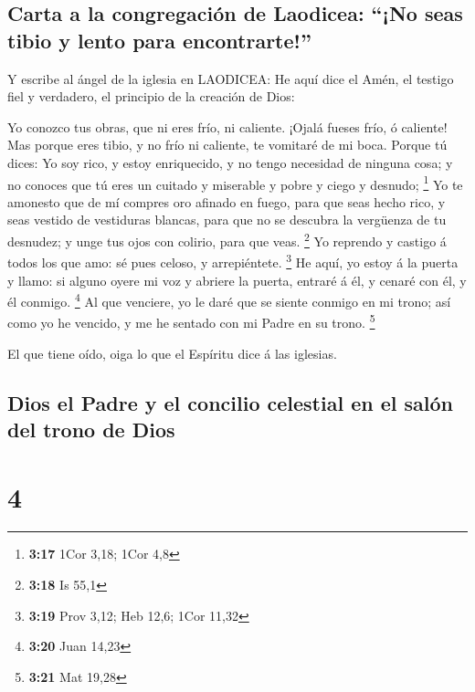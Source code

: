 \hypertarget{carta-a-la-congregaciuxf3n-de-laodicea-no-seas-tibio-y-lento-para-encontrarte}{%
\subsection{Carta a la congregación de Laodicea: ``¡No seas tibio y
lento para
encontrarte!''}\label{carta-a-la-congregaciuxf3n-de-laodicea-no-seas-tibio-y-lento-para-encontrarte}}

 Y escribe al ángel de la iglesia en LAODICEA: He aquí dice
el Amén, el testigo fiel y verdadero, el principio de la creación de
Dios:

 Yo conozco tus obras, que ni eres frío, ni caliente.
¡Ojalá fueses frío, ó caliente!  Mas porque eres tibio, y
no frío ni caliente, te vomitaré de mi boca.  Porque tú
dices: Yo soy rico, y estoy enriquecido, y no tengo necesidad de ninguna
cosa; y no conoces que tú eres un cuitado y miserable y pobre y ciego y
desnudo; \footnote{\textbf{3:17} 1Cor 3,18; 1Cor 4,8}  Yo
te amonesto que de mí compres oro afinado en fuego, para que seas hecho
rico, y seas vestido de vestiduras blancas, para que no se descubra la
vergüenza de tu desnudez; y unge tus ojos con colirio, para que veas.
\footnote{\textbf{3:18} Is 55,1}  Yo reprendo y castigo á
todos los que amo: sé pues celoso, y arrepiéntete. \footnote{\textbf{3:19}
  Prov 3,12; Heb 12,6; 1Cor 11,32}  He aquí, yo estoy á la
puerta y llamo: si alguno oyere mi voz y abriere la puerta, entraré á
él, y cenaré con él, y él conmigo. \footnote{\textbf{3:20} Juan 14,23}
 Al que venciere, yo le daré que se siente conmigo en mi
trono; así como yo he vencido, y me he sentado con mi Padre en su trono.
\footnote{\textbf{3:21} Mat 19,28}

 El que tiene oído, oiga lo que el Espíritu dice á las
iglesias.

\hypertarget{dios-el-padre-y-el-concilio-celestial-en-el-saluxf3n-del-trono-de-dios}{%
\subsection{Dios el Padre y el concilio celestial en el salón del trono
de
Dios}\label{dios-el-padre-y-el-concilio-celestial-en-el-saluxf3n-del-trono-de-dios}}

\hypertarget{section-3}{%
\section{4}\label{section-3}}

